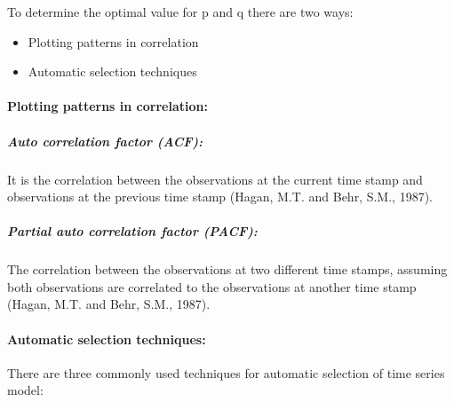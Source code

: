 \documentclass[
  onepage,
  openany]{scrbook}
\let\oldparagraph\paragraph
\renewcommand{\paragraph}[1]{\oldparagraph{#1}\mbox{}}
\let\oldsubparagraph\subparagraph
\renewcommand{\subparagraph}[1]{\oldsubparagraph{#1}\mbox{}}
\begin{document}
To determine the optimal value for p and q there are two ways:

\begin{itemize}
\item
  Plotting patterns in correlation
\item
  Automatic selection techniques
\end{itemize}

\hypertarget{plotting-patterns-in-correlation}{%
\paragraph{\texorpdfstring{\textbf{Plotting patterns in
correlation:}}{Plotting patterns in correlation:}}\label{plotting-patterns-in-correlation}}

\hypertarget{auto-correlation-factor-acf}{%
\subparagraph{\texorpdfstring{\textbf{Auto correlation factor
(ACF):}}{Auto correlation factor (ACF):}}\label{auto-correlation-factor-acf}}

It is the correlation between the observations at the current time stamp
and observations at the previous time stamp (Hagan, M.T. and Behr, S.M.,
1987).

\hypertarget{partial-auto-correlation-factor-pacf}{%
\subparagraph{\texorpdfstring{\textbf{Partial auto correlation factor
(PACF):}}{Partial auto correlation factor (PACF):}}\label{partial-auto-correlation-factor-pacf}}

The correlation between the observations at two different time stamps,
assuming both observations are correlated to the observations at another
time stamp (Hagan, M.T. and Behr, S.M., 1987).

\hypertarget{automatic-selection-techniques}{%
\paragraph{\texorpdfstring{\textbf{Automatic selection
techniques:}}{Automatic selection techniques:}}\label{automatic-selection-techniques}}

There are three commonly used techniques for automatic selection of time
series model:

\hypertarget{section}{%
\subparagraph{}\label{section}}
\end{document}
